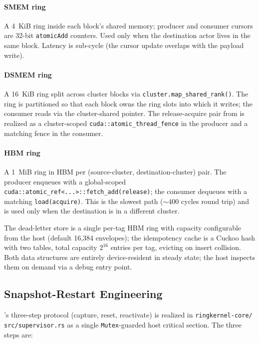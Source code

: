 \paragraph{SMEM ring}
A 4~KiB ring inside each block's shared memory; producer and
consumer cursors are 32-bit \texttt{atomicAdd} counters. Used only
when the destination actor lives in the same block.  Latency is
sub-cycle (the cursor update overlaps with the payload write).

\paragraph{DSMEM ring}
A 16~KiB ring split across cluster blocks via
\texttt{cluster.map\_shared\_rank()}. The ring is partitioned so that
each block owns the ring slots into which it writes; the consumer
reads via the cluster-shared pointer. The release-acquire pair from
 is realized as a cluster-scoped
\texttt{cuda::atomic\_thread\_fence} in the producer and a matching
fence in the consumer.

\paragraph{HBM ring}
A 1~MiB ring in HBM per (source-cluster, destination-cluster) pair.
The producer enqueues with a global-scoped
\texttt{cuda::atomic\_ref<...>::fetch\_add(release)}; the consumer
dequeues with a matching \texttt{load(acquire)}.  This is the
slowest path ($\sim$400 cycles round trip) and is used only when
the destination is in a different cluster.

The dead-letter store is a single per-tag HBM ring with capacity
configurable from the host (default 16,384 envelopes); the
idempotency cache is a Cuckoo hash with two tables, total capacity
\(2^{16}\) entries per tag, evicting on insert collision.  Both
data structures are entirely device-resident in steady state; the
host inspects them on demand via a debug entry point.

\subsection{Snapshot-Restart Engineering}
\label{sec:implementation:snapshot}

's three-step protocol (capture,
reset, reactivate) is realized in
\texttt{ringkernel-\allowbreak core/\allowbreak
src/supervisor.rs} as a single
\texttt{Mutex}-guarded host critical section.  The three steps
are:

